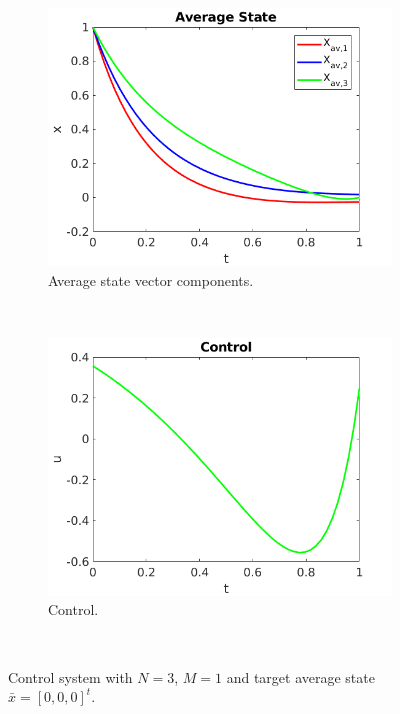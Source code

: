 \documentclass[10pt,a4paper]{article}
\begin{document}
\begin{figure}[h]
    \centering
    \begin{subfigure}[b]{0.4\textwidth}
        \includegraphics[width=\textwidth]{xav.png}
        \caption{Average state vector components.}
        \label{fig:averageStateVector}
    \end{subfigure}
    ~ %
    \begin{subfigure}[b]{0.4\textwidth}
        \includegraphics[width=\textwidth]{u.png}
        \caption{Control.}
        \label{fig:Control}
    \end{subfigure}
    ~ %
    \caption{Control system with $N=3$, $M=1$ and target average state $\bar{x}=[0,0,0]^t$.}\label{fig:Results1}
\end{figure}
\end{document}
